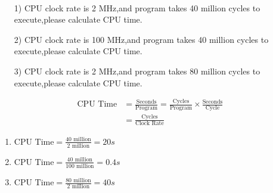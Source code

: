 \begin{exercise}[]{
    \par{~}
    \begin{enumerate}
        \item [1)] 
        CPU clock rate is 2 MHz,and program takes 40 million cycles to execute,please calculate CPU time.     
      \item [2)]
        CPU clock rate is 100 MHz,and program takes 40 million cycles to execute,please calculate CPU time.  
      \item [3)]
        CPU clock rate is 2 MHz,and program takes 80 million cycles to execute,please calculate CPU time.
    \end{enumerate}}
  \begin{solution}

    \begin{equation}
        \begin{aligned}
            \text{CPU Time} &= \frac{\text{Seconds}}{\text{Program}} = \frac{\text{Cycles}}{\text{Program}} \times \frac{\text{Seconds}}{\text{Cycle}} \\
            &= \frac{\text{Cycles}}{\text{Clock Rate}}
        \end{aligned}
    \end{equation}
  \begin{enumerate}
      \item $\text{CPU Time} = \frac{40\text{ million}}{2 \text{ million}} = 20 s$
      \item $\text{CPU Time} = \frac{40\text{ million}}{100 \text{ million}} = 0.4 s$
      \item $\text{CPU Time} = \frac{80\text{ million}}{2 \text{ million}} = 40 s$
  \end{enumerate}
  \end{solution}
  \label{ex1}
\end{exercise}


